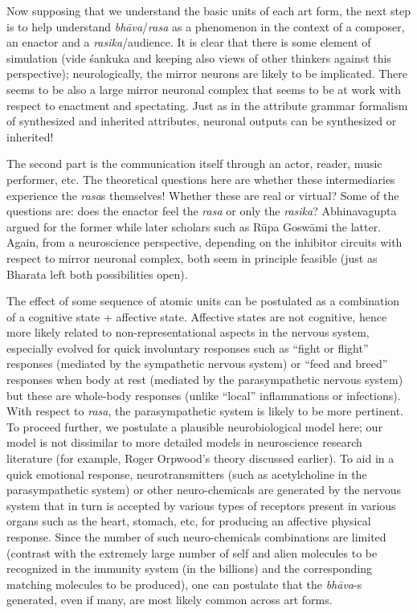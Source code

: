Now supposing that we understand the basic units of each art form, the next step is to help understand \textsl{bhāva}/\textsl{rasa} as a phenomenon in the context of a composer, an enactor and a \textsl{rasika}/audience. It is clear that there is some element of simulation (vide śankuka and keeping also views of other thinkers against this perspective); neurologically, the mirror neurons are likely to be implicated. There seems to be also a large mirror neuronal complex that seems to be at work with respect to enactment and spectating. Just as in the attribute grammar formalism of synthesized and inherited attributes, neuronal outputs can be synthesized or inherited!

The second part is the communication itself through an actor, reader, music performer, etc. The theoretical questions here are whether these intermediaries experience the \textsl{rasa}s themselves! Whether these are real or virtual? Some of the questions are: does the enactor feel the \textsl{rasa} or only the \textsl{rasika}? Abhinavagupta argued for the former while later scholars such as Rūpa Goswāmi the latter. Again, from a neuroscience perspective, depending on the inhibitor circuits with respect to mirror neuronal complex, both seem in principle feasible (just as Bharata left both possibilities open).

The effect of some sequence of atomic units can be postulated as a combination of a cognitive state + affective state. Affective states are not cognitive, hence more likely related to non-representational aspects in the nervous system, especially evolved for quick involuntary responses such as “fight or flight” responses (mediated by the sympathetic nervous system) or “feed and breed” responses when body at rest (mediated by the parasympathetic nervous system) but these are whole-body responses (unlike “local” inflammations or infections). With respect to \textsl{rasa}, the parasympathetic system is likely to be more pertinent. To proceed further, we postulate a plausible neurobiological model here; our model is not dissimilar to more detailed models in neuroscience research literature (for example, Roger Orpwood’s theory discussed earlier). To aid in a quick emotional response, neurotransmitters (such as acetylcholine in the parasympathetic system) or other neuro-chemicals are generated by the nervous system that in turn is accepted by various types of receptors present in various organs such as the heart, stomach, etc, for producing an affective physical response. Since the number of such neuro-chemicals combinations are limited (contrast with the extremely large number of self and alien molecules to be recognized in the immunity system (in the billions) and the corresponding matching molecules to be produced), one can postulate that the \textsl{bhāva}-s generated, even if many, are most likely common across art forms. 

